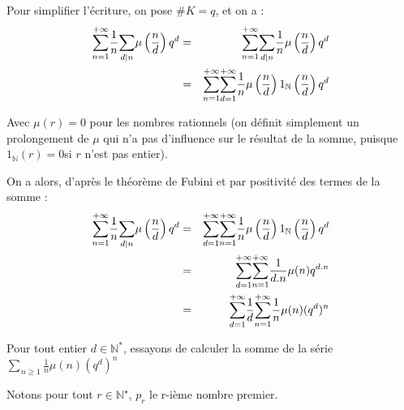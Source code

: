 Pour simplifier l'{\'e}criture, on pose $\#K = q$, et on a :
\begin{eqnarray*}
  \underset{n = 1}{\overset{+ \infty}{\sum}} \frac{1}{n} \underset{d | n
  }{\sum} \mu \left( \frac{n}{d} \right) q^d & = & \underset{n =
  1}{\overset{+ \infty}{\sum}} \underset{d | n }{\sum} \frac{1}{n}
  \mu \left( \frac{n}{d} \right) q^d\\
  & = & \underset{n = 1}{\overset{+ \infty}{\sum}} \underset{d =
  1}{\overset{+ \infty}{\sum}} \frac{1}{n} \mu \left( \frac{n}{d} \right)
  1_{\mathbb{N}} \left( \frac{n}{d} \right) q^d
\end{eqnarray*}


$\underset{}{}$Avec $\mu (r) = 0$ pour les nombres rationnels (on d{\'e}finit
simplement un prolongement de $\mu$ qui n'a pas d'influence sur le
r{\'e}sultat de la somme, puisque $1_{\mathbb{N}} (r) = 0$si $r$ n'est pas
entier).

On a alors, d'apr{\`e}s le th{\'e}or{\`e}me de Fubini et par positivit{\'e}
des termes de la somme :
\begin{eqnarray*}
  \underset{n = 1}{\overset{+ \infty}{\sum}} \frac{1}{n} \underset{d | n
  }{\sum} \mu \left( \frac{n}{d} \right) q^d & = & \underset{d =
  1}{\overset{+ \infty}{\sum}} \underset{n = 1}{\overset{+ \infty}{\sum}}
  \frac{1}{n} \mu \left( \frac{n}{d} \right) 1_{\mathbb{N}} \left( \frac{n}{d}
  \right) q^d\\
  & = & \underset{d = 1}{\overset{+ \infty}{\sum}} \underset{n =
  1}{\overset{+ \infty}{\sum}} \frac{1}{d.n} \mu (n) q^{d.n}\\
  & = & \underset{d = 1}{\overset{+ \infty}{\sum}} \frac{1}{d} \underset{n =
  1}{\overset{+ \infty}{\sum}} \frac{1}{n} \mu (n) (q^d)^n
\end{eqnarray*}


Pour tout entier $d \in \mathbb{N}^{\ast}$, essayons de calculer la somme de
la s{\'e}rie $\underset{n \geqslant 1}{\overset{}{\sum}} \frac{1}{n} \mu (n)
(q^d)^n$

Notons pour tout $r \in \mathbb{N}^{\star}$, $p_r$ le r-i{\`e}me nombre
premier.

